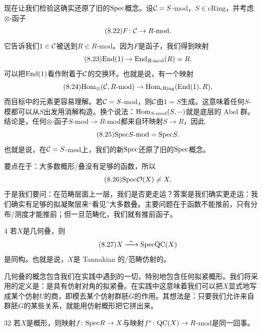 现在让我们检验这确实还原了旧的$\mathrm{Spec}$概念。设$\mathcal{C}=S$-mod，$S\in\mathrm{cRing}$，并考虑$\otimes$-函子
\begin{equation}\tag{8.22}
F\colon \mathcal{C}\to R\text{-mod}.
\end{equation}
它告诉我们$1\in\mathcal{C}$被送到$R\in R$-mod。因为$F$是函子，我们得到映射
\begin{equation}\tag{8.23}
\mathrm{End}(1)\to\mathrm{End}_{R\text{-mod}}(R)=R.
\end{equation}
可以把$\mathrm{End}(1)$看作附着于$\mathcal{C}$的交换环。也就是说，有一个映射
\begin{equation}\tag{8.24}
\mathrm{Hom}_{\otimes}(\mathcal{C},R\text{-mod})\to\mathrm{Hom}_{\mathrm{cRing}}(\mathrm{End}(1),R),
\end{equation}
而目标中的元素更容易理解。若$\mathcal{C}=S$-mod，则$\mathcal{C}$由$1=S$生成。这意味着任何$S$-模都可以从$S$出发用消解构造。换个说法：$\mathrm{Hom}_{S\text{-mod}}(S,-)$就是底层的 Abel 群。结论是，任何$\otimes$-函子$S$-mod$\to R$-mod都来自环映射$S\to R$，因此
\begin{equation}\tag{8.25}
\mathrm{Spec} S\text{-mod}=\mathrm{Spec} S.
\end{equation}
也就是说，在$\mathcal{C}=S$-mod上，我们的新$\mathrm{Spec}$还原了旧的$\mathrm{Spec}$概念。

\medskip
\noindent 要点在于：大多数概形/叠没有足够的函数，所以
\begin{equation}\tag{8.26}
\mathrm{Spec}\mathcal{O}(X)\neq X.
\end{equation}
于是我们要问：在范畴层面上一层，我们是否更走运？答案是我们确实更走运：我们确实有足够的拟凝聚层来“看见”大多数叠。主要问题在于函数不能推前，只有分布/测度才能推前；但一旦范畴化，我们就有推前函子。

\begin{srcthm}{4}
若$X$是几何叠，则
\begin{equation}\tag{8.27}
X\xrightarrow{\ \sim\ }\mathrm{Spec}\mathrm{QC}(X)
\end{equation}
是同构。也就是说，$X$是 Tannakian 的/范畴仿射的。
\end{srcthm}

几何叠的概念包含我们在实践中遇到的一切，特别地包含任何拟紧概形。我们将采用的定义是：是具有仿射对角的拟紧叠。在实践中这意味着我们可以把$X$显式地写成某个仿射$U$的商，即模去某个仿射群胚$G$的作用。其想法是：只要我们允许来自群胚$G$的某些关系，就能用仿射概形把它拼出来。

\begin{srcex}{32}
若$X$是概形，则映射$f\colon\mathrm{Spec} R\to X$与映射$f^{*}\colon\mathrm{QC}(X)\to R$-mod是同一回事。
\end{srcex}

